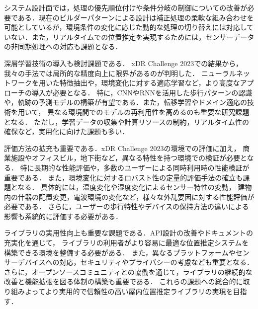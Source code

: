 システム設計面では，処理の優先順位付けや条件分岐の制御についての改善が必要である．現在のビルダーパターンによる設計は補正処理の柔軟な組み合わせを可能としているが，環境条件の変化に応じた動的な処理の切り替えには対応していない．また，リアルタイムでの位置推定を実現するためには，センサーデータの非同期処理への対応も課題となる．

深層学習技術の導入も検討課題である．
xDR Challenge 2023での結果から，我々の手法では局所的な精度向上に限界があるのが判明した．
ニューラルネットワークを用いた特徴抽出や，環境変化に対する適応学習など，より高度なアプローチの導入が必要となる．
特に，CNNやRNNを活用した歩行パターンの認識や，軌跡の予測モデルの構築が有望である．また，転移学習やドメイン適応の技術を用いて，
異なる環境間でのモデルの再利用性を高めるのも重要な研究課題となる．
ただし，学習データの収集や計算リソースの制約，リアルタイム性の確保など，実用化に向けた課題も多い．

評価方法の拡充も重要である．xDR Challenge 2023の環境での評価に加え，
商業施設やオフィスビル，地下街など，異なる特性を持つ環境での検証が必要となる．
特に長期的な性能評価や，多数のユーザーによる同時利用時の性能検証が重要である．
また，環境変化に対するロバスト性の定量的評価手法の確立も課題となる．
具体的には，温度変化や湿度変化によるセンサー特性の変動，
建物内の什器の配置変更，電波環境の変化など，様々な外乱要因に対する性能評価が必要である．
さらに，ユーザーの歩行特性やデバイスの保持方法の違いによる影響も系統的に評価する必要がある．

ライブラリの実用性向上も重要な課題である．API設計の改善やドキュメントの充実化を通じて，
ライブラリの利用者がより容易に最適な位置推定システムを構築できる環境を整備する必要がある．
また，異なるプラットフォームやセンサーデバイスへの対応，セキュリティやプライバシーの考慮なども重要となる．
さらに，オープンソースコミュニティとの協働を通じて，ライブラリの継続的な改善と機能拡張を図る体制の構築も重要である．
これらの課題への総合的に取り組みよってより実用的で信頼性の高い屋内位置推定ライブラリの実現を目指す．

